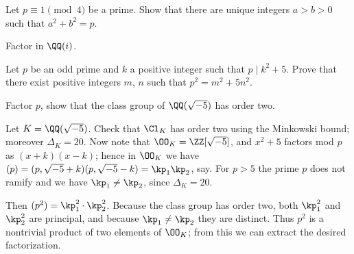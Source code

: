 \begin{problem}
	Let $p \equiv 1 \pmod 4$ be a prime.
	Show that there are unique integers $a > b > 0$ such that $a^2+b^2=p$.
	\begin{hint}
		Factor in $\QQ(i)$.
	\end{hint}
\end{problem}


\begin{problem}
	Let $p$ be an odd prime and $k$ a positive integer such that $p \mid k^2+5$.
	Prove that there exist positive integers $m$, $n$ such that $p^2 = m^2+5n^2$.
	\begin{hint}
		Factor $p$, show that the class group of $\QQ(\sqrt{-5})$ has order two.
	\end{hint}
	\begin{sol}
		Let $K = \QQ(\sqrt{-5})$. Check that $\Cl_K$ has order two using the Minkowski bound;
		moreover $\Delta_K = 20$.
		Now note that $\OO_K = \ZZ[\sqrt{-5}]$, and $x^2+5$ factors mod $p$ as $(x+k)(x-k)$;
		hence in $\OO_K$ we have $(p) = (p, \sqrt{-5}+k)(p, \sqrt{-5}-k) = \kp_1 \kp_2$, say.
		For $p > 5$ the prime $p$ does not ramify and we have $\kp_1 \neq \kp_2$, since $\Delta_K = 20$.

		Then $(p^2) = \kp_1^2 \cdot \kp_2^2$. Because the class group has order two,
		both $\kp_1^2$ and $\kp_2^2$ are principal, and because $\kp_1 \neq \kp_2$ they are distinct.
		Thus $p^2$ is a nontrivial product of two elements of $\OO_K$; from this we can extract the desired factorization.
	\end{sol}
\end{problem}
